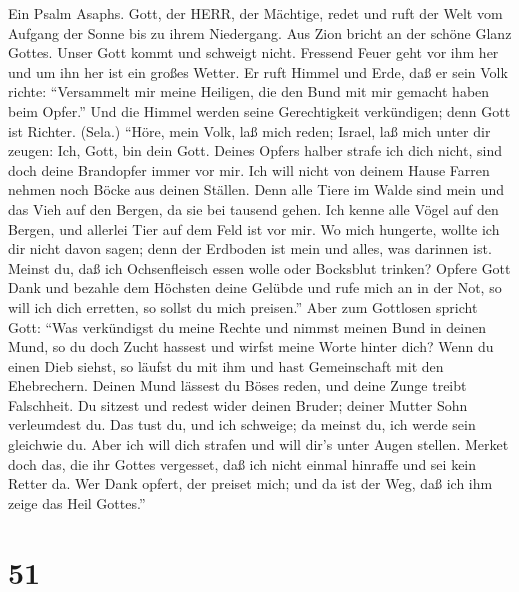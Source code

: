 Ein Psalm Asaphs. Gott, der HERR, der Mächtige, redet und
ruft der Welt vom Aufgang der Sonne bis zu ihrem Niedergang.
 Aus Zion bricht an der schöne Glanz Gottes. 
Unser Gott kommt und schweigt nicht. Fressend Feuer geht vor ihm her und
um ihn her ist ein großes Wetter.  Er ruft Himmel und Erde,
daß er sein Volk richte:  ``Versammelt mir meine Heiligen,
die den Bund mit mir gemacht haben beim Opfer.''  Und die
Himmel werden seine Gerechtigkeit verkündigen; denn Gott ist Richter.
(Sela.)  ``Höre, mein Volk, laß mich reden; Israel, laß mich
unter dir zeugen: Ich, Gott, bin dein Gott.  Deines Opfers
halber strafe ich dich nicht, sind doch deine Brandopfer immer vor mir.
 Ich will nicht von deinem Hause Farren nehmen noch Böcke
aus deinen Ställen.  Denn alle Tiere im Walde sind mein und
das Vieh auf den Bergen, da sie bei tausend gehen.  Ich
kenne alle Vögel auf den Bergen, und allerlei Tier auf dem Feld ist vor
mir.  Wo mich hungerte, wollte ich dir nicht davon sagen;
denn der Erdboden ist mein und alles, was darinnen ist. 
Meinst du, daß ich Ochsenfleisch essen wolle oder Bocksblut trinken?
 Opfere Gott Dank und bezahle dem Höchsten deine Gelübde
 und rufe mich an in der Not, so will ich dich erretten, so
sollst du mich preisen.''  Aber zum Gottlosen spricht Gott:
``Was verkündigst du meine Rechte und nimmst meinen Bund in deinen Mund,
 so du doch Zucht hassest und wirfst meine Worte hinter
dich?  Wenn du einen Dieb siehst, so läufst du mit ihm und
hast Gemeinschaft mit den Ehebrechern.  Deinen Mund lässest
du Böses reden, und deine Zunge treibt Falschheit.  Du
sitzest und redest wider deinen Bruder; deiner Mutter Sohn verleumdest
du.  Das tust du, und ich schweige; da meinst du, ich werde
sein gleichwie du. Aber ich will dich strafen und will dir's unter Augen
stellen.  Merket doch das, die ihr Gottes vergesset, daß
ich nicht einmal hinraffe und sei kein Retter da.  Wer Dank
opfert, der preiset mich; und da ist der Weg, daß ich ihm zeige das Heil
Gottes.''

\hypertarget{section-50}{%
\section{51}\label{section-50}}

